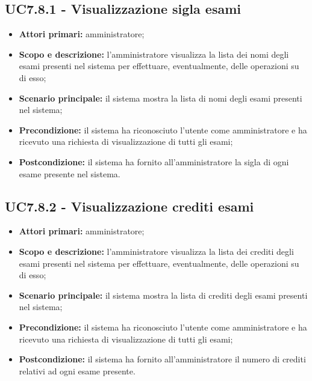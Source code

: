 \documentclass[AnalisiDeiRequisiti.tex]{subfiles}
\begin{document}
\subsection{UC7.8.1 - Visualizzazione sigla esami}
\begin{itemize}
	\item \textbf{Attori primari:} amministratore;
	\item \textbf{Scopo e descrizione:} l'amministratore visualizza la lista dei nomi degli esami presenti nel sistema per effettuare, eventualmente, delle operazioni su di esso;
	\item \textbf{Scenario principale:} il sistema mostra la lista di nomi degli esami presenti nel sistema;
	\item \textbf{Precondizione:} il sistema ha riconosciuto l'utente come amministratore e ha ricevuto una richiesta di visualizzazione di tutti gli esami; 
	\item \textbf{Postcondizione:} il sistema ha fornito all'amministratore la sigla di ogni esame presente nel sistema.
\end{itemize}
\subsection{UC7.8.2 - Visualizzazione crediti esami}
\begin{itemize}
	\item \textbf{Attori primari:} amministratore;
	\item \textbf{Scopo e descrizione:} l'amministratore visualizza la lista dei crediti degli esami presenti nel sistema per effettuare, eventualmente, delle operazioni su di esso;
	\item \textbf{Scenario principale:} il sistema mostra la lista di crediti degli esami presenti nel sistema;
	\item \textbf{Precondizione:} il sistema ha riconosciuto l'utente come amministratore e ha ricevuto una richiesta di visualizzazione di tutti gli esami; 
	\item \textbf{Postcondizione:} il sistema ha fornito all'amministratore il numero di crediti relativi ad ogni esame presente.
\end{itemize}
\end{document}
